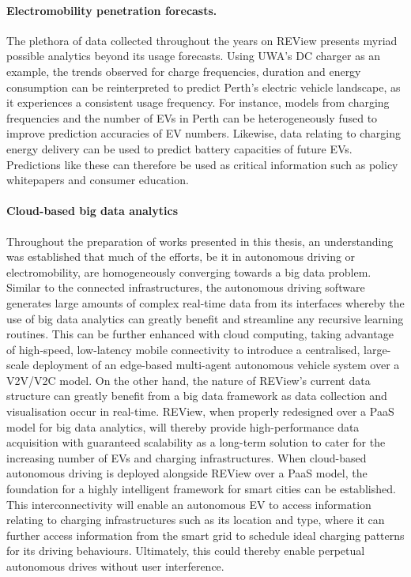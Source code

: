 \paragraph{Electromobility penetration forecasts.} The plethora of data collected throughout the years on REView presents myriad possible analytics beyond its usage forecasts. Using UWA's DC charger as an example, the trends observed for charge frequencies, duration and energy consumption can be reinterpreted to predict Perth's electric vehicle landscape, as it experiences a consistent usage frequency. For instance, models from charging frequencies and the number of EVs in Perth can be heterogeneously fused to improve prediction accuracies of EV numbers. Likewise, data relating to charging energy delivery can be used to predict battery capacities of future EVs. Predictions like these can therefore be used as critical information such as policy whitepapers and consumer education.   %

\paragraph{Cloud-based big data analytics} Throughout the preparation of works presented in this thesis, an understanding was established that much of the efforts, be it in autonomous driving or electromobility, are homogeneously converging towards a big data problem. Similar to the connected infrastructures, the autonomous driving software generates large amounts of complex real-time data from its interfaces whereby the use of big data analytics can greatly benefit and streamline any recursive learning routines. This can be further enhanced with cloud computing, taking advantage of high-speed, low-latency mobile connectivity to introduce a centralised, large-scale deployment of an edge-based multi-agent autonomous vehicle system over a V2V/V2C model. On the other hand, the nature of REView's current data structure can greatly benefit from a big data framework as data collection and visualisation occur in real-time. REView, when properly redesigned over a PaaS model for big data analytics, will thereby provide high-performance data acquisition with guaranteed scalability as a long-term solution to cater for the increasing number of EVs and charging infrastructures. When cloud-based autonomous driving is deployed alongside REView over a PaaS model, the foundation for a highly intelligent framework for smart cities can be established. This interconnectivity will enable an autonomous EV to access information relating to charging infrastructures such as its location and type, where it can further access information from the smart grid to schedule ideal charging patterns for its driving behaviours. Ultimately, this could thereby enable perpetual autonomous drives without user interference. 

